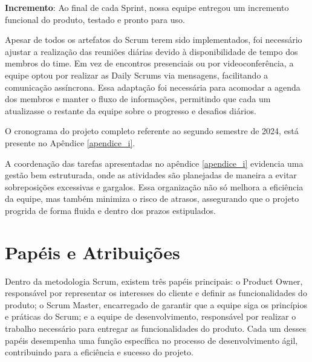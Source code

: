 \textbf{Incremento}: Ao final de cada Sprint, nossa equipe entregou um incremento funcional do produto, testado e pronto para uso. 

Apesar de todos os artefatos do Scrum terem sido implementados, foi necessário ajustar a realização das reuniões diárias devido à disponibilidade de tempo dos membros do time. Em vez de encontros presenciais ou por videoconferência, a equipe optou por realizar as Daily Scrums via mensagens, facilitando a comunicação assíncrona. Essa adaptação foi necessária para acomodar a agenda dos membros e manter o fluxo de informações, permitindo que cada um atualizasse o restante da equipe sobre o progresso e desafios diários.

O cronograma do projeto completo referente ao segundo semestre de 2024, está presente no Apêndice \ref{apendice_i}.


 A coordenação das tarefas apresentadas no apêndice  \ref{apendice_i} evidencia uma gestão bem estruturada, onde as atividades são planejadas de maneira a evitar sobreposições excessivas e gargalos. Essa organização não só melhora a eficiência da equipe, mas também minimiza o risco de atrasos, assegurando que o projeto progrida de forma fluida e dentro dos prazos estipulados.
\newpage

\section{Papéis e Atribuições}

Dentro da metodologia Scrum, existem três papéis principais: o Product Owner, responsável por representar os interesses do cliente e definir as funcionalidades do produto; o Scrum Master, encarregado de garantir que a equipe siga os princípios e práticas do Scrum; e a equipe de desenvolvimento, responsável por realizar o trabalho necessário para entregar as funcionalidades do produto. Cada um desses papéis desempenha uma função específica no processo de desenvolvimento ágil, contribuindo para a eficiência e sucesso do projeto.

